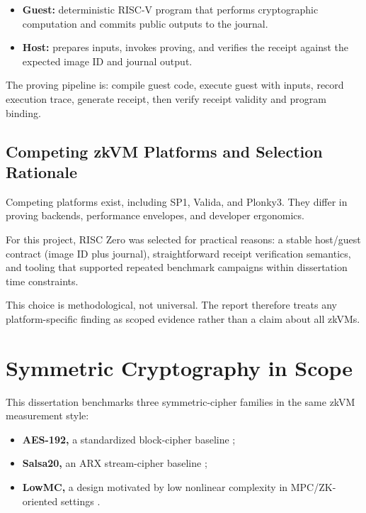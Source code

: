 \begin{itemize}
\item \textbf{Guest:} deterministic RISC-V program that performs cryptographic
computation and commits public outputs to the journal.
\item \textbf{Host:} prepares inputs, invokes proving, and verifies the receipt
against the expected image ID and journal output.
\end{itemize}

The proving pipeline is: compile guest code, execute guest with inputs, record
execution trace, generate receipt, then verify receipt validity and program
binding.

\subsection*{Competing zkVM Platforms and Selection Rationale}

Competing platforms exist, including SP1, Valida, and Plonky3. They differ in
proving backends, performance envelopes, and developer ergonomics.

For this project, RISC Zero was selected for practical reasons: a stable
host/guest contract (image ID plus journal), straightforward receipt
verification semantics, and tooling that supported repeated benchmark campaigns
within dissertation time constraints.

This choice is methodological, not universal. The report therefore treats any
platform-specific finding as scoped evidence rather than a claim about all
zkVMs.

\section{Symmetric Cryptography in Scope}

This dissertation benchmarks three symmetric-cipher families in the same zkVM
measurement style:

\begin{itemize}
\item \textbf{AES-192,} a standardized block-cipher baseline
\cite{nistfips197,daemen2002rijndael};
\item \textbf{Salsa20,} an ARX stream-cipher baseline
\cite{bernstein2008salsa20};
\item \textbf{LowMC,} a design motivated by low nonlinear complexity in
MPC/ZK-oriented settings \cite{albrecht2015ciphers}.
\end{itemize}

